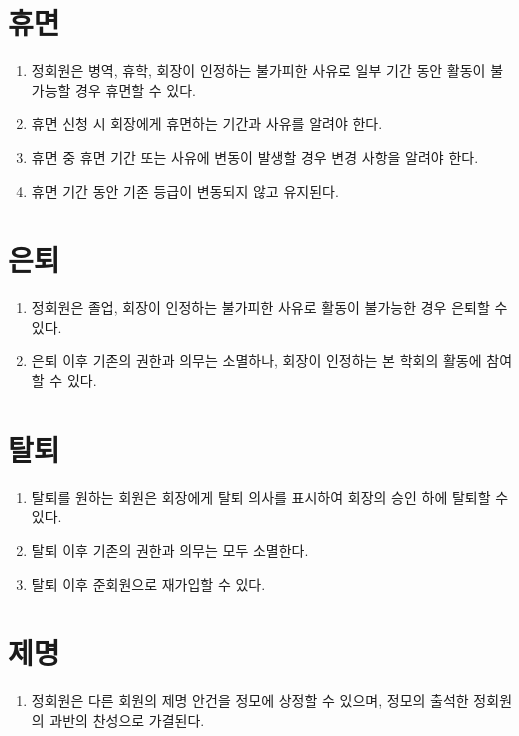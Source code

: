 \documentclass{oblivoir}
\begin{document}
\section{휴면}
\begin{enumerate}
    \item 정회원은 병역, 휴학, 회장이 인정하는 불가피한 사유로 일부 기간 동안 활동이 불가능할
          경우 휴면할 수 있다.
    \item 휴면 신청 시 회장에게 휴면하는 기간과 사유를 알려야 한다.
    \item 휴면 중 휴면 기간 또는 사유에 변동이 발생할 경우 변경 사항을 알려야 한다.
    \item 휴면 기간 동안 기존 등급이 변동되지 않고 유지된다.
\end{enumerate}

\section{은퇴}
\begin{enumerate}
    \item
          정회원은 졸업, 회장이 인정하는 불가피한 사유로 활동이 불가능한 경우 은퇴할 수 있다.
    \item
          은퇴 이후 기존의 권한과 의무는 소멸하나, 회장이 인정하는 본 학회의 활동에 참여할
          수 있다.
\end{enumerate}

\section{탈퇴}
\begin{enumerate}
    \item  탈퇴를 원하는 회원은 회장에게 탈퇴 의사를 표시하여 회장의 승인 하에 탈퇴할 수 있다.
    \item  탈퇴 이후 기존의 권한과 의무는 모두 소멸한다.
    \item  탈퇴 이후 준회원으로 재가입할 수 있다.
\end{enumerate}

\section{제명}
\begin{enumerate}
    \item  정회원은 다른 회원의 제명 안건을 정모에 상정할 수 있으며, 정모의 출석한 정회원의 과반의 찬성으로 가결된다.
\end{enumerate}
\end{document}
